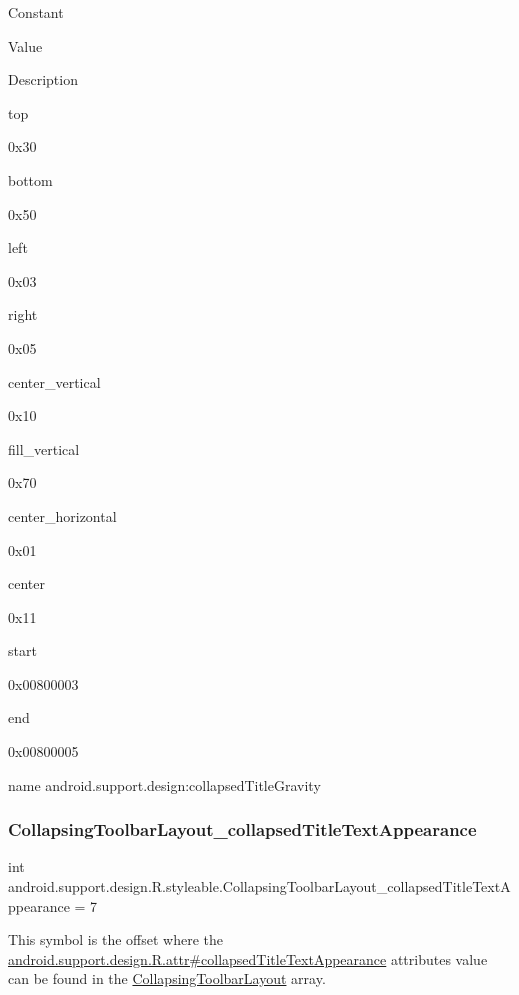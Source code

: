 Constant

Value

Description 

{\ttfamily top}

0x30

{\ttfamily bottom}

0x50

{\ttfamily left}

0x03

{\ttfamily right}

0x05

{\ttfamily center\+\_\+vertical}

0x10

{\ttfamily fill\+\_\+vertical}

0x70

{\ttfamily center\+\_\+horizontal}

0x01

{\ttfamily center}

0x11

{\ttfamily start}

0x00800003

{\ttfamily end}

0x00800005

name android.\+support.\+design\+:collapsed\+Title\+Gravity \mbox{\label{classandroid_1_1support_1_1design_1_1R_1_1styleable_a86e1c80d3c72a9b5420d66a51d90a49f}} 
\subsubsection{\texorpdfstring{Collapsing\+Toolbar\+Layout\+\_\+collapsed\+Title\+Text\+Appearance}{CollapsingToolbarLayout\_collapsedTitleTextAppearance}}
{\footnotesize\ttfamily int android.\+support.\+design.\+R.\+styleable.\+Collapsing\+Toolbar\+Layout\+\_\+collapsed\+Title\+Text\+Appearance = 7\hspace{0.3cm}{\ttfamily [static]}}

This symbol is the offset where the \hyperlink{classandroid_1_1support_1_1design_1_1R_1_1attr_a1ad0c01d0351c460d4cee0ba2b6ed855}{android.\+support.\+design.\+R.\+attr\#collapsed\+Title\+Text\+Appearance} attribute\textquotesingle{}s value can be found in the \hyperlink{classandroid_1_1support_1_1design_1_1R_1_1styleable_a4a019838b1c3daad84b4ffff397db335}{Collapsing\+Toolbar\+Layout} array.

